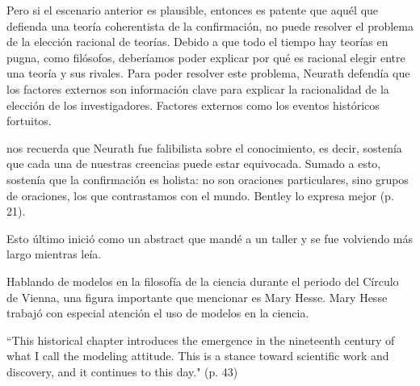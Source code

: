 Pero si el escenario anterior es plausible, entonces es patente que aquél que defienda una teoría coherentista de la confirmación, no puede resolver el problema de la elección racional de teorías.
Debido a que todo el tiempo hay teorías en pugna, como filósofos, deberíamos poder explicar por qué es racional elegir entre una teoría y sus rivales. Para poder resolver este problema, Neurath defendía que los factores externos son información clave para explicar la racionalidad de la elección de los investigadores.
Factores externos como los eventos históricos fortuitos.

\textcite{Bentley2023} nos recuerda que Neurath fue falibilista sobre el conocimiento, es decir,  sostenía que cada una de nuestras creencias puede estar equivocada.
Sumado a esto, sostenía que la confirmación es holista: no son oraciones particulares, sino grupos de oraciones, los que contrastamos con el mundo.
Bentley lo expresa mejor  (p. 21).



Esto último inició como un abstract que mandé a un taller y se fue volviendo más largo mientras leía.

Hablando de modelos en la filosofía de la ciencia durante el periodo del Círculo de Vienna, una figura importante que mencionar es Mary Hesse.
Mary Hesse trabajó con especial atención el uso de modelos en la ciencia.

``This historical chapter introduces the emergence in the nineteenth century of  what I call the modeling attitude.
This is a stance toward scientific work and  discovery, and it continues to this day." (p. 43)






